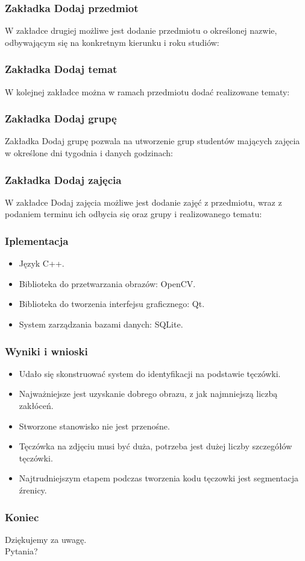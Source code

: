 \documentclass{beamer}
\begin{document}
\begin{frame}
\frametitle{Zakładka Dodaj przedmiot}
W zakładce drugiej możliwe jest dodanie przedmiotu o określonej nazwie, odbywającym się na konkretnym kierunku i roku studiów:

\end{frame}

\begin{frame}
\frametitle{Zakładka Dodaj temat}
W kolejnej zakładce można w ramach przedmiotu dodać realizowane tematy:

\end{frame}

\begin{frame}
\frametitle{Zakładka Dodaj grupę}
Zakładka Dodaj grupę pozwala na utworzenie grup studentów mających zajęcia w określone dni tygodnia i danych godzinach:

\end{frame}

\begin{frame}
\frametitle{Zakładka Dodaj zajęcia}
W zakładce Dodaj zajęcia możliwe jest dodanie zajęć z przedmiotu, wraz z podaniem terminu ich odbycia się oraz grupy i realizowanego tematu:

\end{frame}

\begin{frame}
\frametitle{Iplementacja}
\begin{itemize}
\item Język C++.
\item Biblioteka do przetwarzania obrazów: OpenCV.
\item Biblioteka do tworzenia interfejsu graficznego: Qt.
\item System zarządzania bazami danych: SQLite.
\end{itemize}
\end{frame}



\begin{frame}
\frametitle{Wyniki i wnioski}
\begin{itemize}
\item Udało się skonstruować system do identyfikacji na podstawie tęczówki.
\item Najważniejsze jest uzyskanie dobrego obrazu, z jak najmniejszą liczbą zakłóceń.
\item Stworzone stanowisko nie jest przenośne.
\item Tęczówka na zdjęciu musi być duża, potrzeba jest dużej liczby szczegółów tęczówki.
\item Najtrudniejszym etapem podczas tworzenia kodu tęczowki jest segmentacja źrenicy.
\end{itemize}
\end{frame}
\begin{frame}
\frametitle{Koniec}

\begin{block}{}
Dziękujemy za uwagę.\\
Pytania?
\end{block}

\end{frame}

\end{document}
